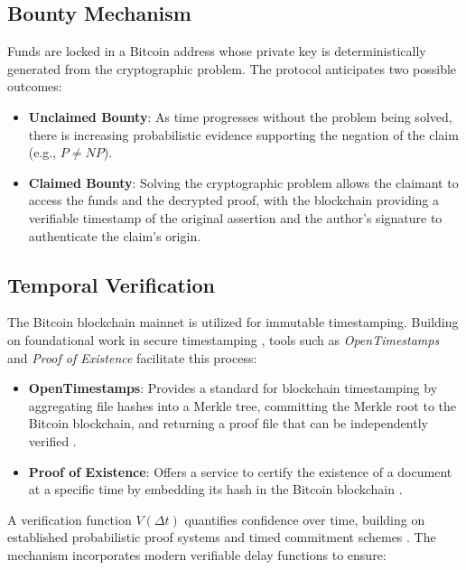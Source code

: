 \documentclass[12pt]{report}
\begin{document}
\subsection{Bounty Mechanism}

Funds are locked in a Bitcoin address whose private key is deterministically generated from the cryptographic problem. The protocol anticipates two possible outcomes:

\begin{itemize}
    \item \textbf{Unclaimed Bounty}: As time progresses without the problem being solved, there is increasing probabilistic evidence supporting the negation of the claim (e.g., \( P \neq NP \)).
    \item \textbf{Claimed Bounty}: Solving the cryptographic problem allows the claimant to access the funds and the decrypted proof, with the blockchain providing a verifiable timestamp of the original assertion and the author's signature to authenticate the claim's origin.
\end{itemize}

\subsection{Temporal Verification}
The Bitcoin blockchain mainnet \cite{Nakamoto2008} is utilized for immutable timestamping. Building on foundational work in secure timestamping \cite{HaberStornetta1991}, tools such as \textit{OpenTimestamps} and \textit{Proof of Existence} facilitate this process:

\begin{itemize}
    \item \textbf{OpenTimestamps}: Provides a standard for blockchain timestamping by aggregating file hashes into a Merkle tree, committing the Merkle root to the Bitcoin blockchain, and returning a proof file that can be independently verified \cite{opentimestamps}.
    \item \textbf{Proof of Existence}: Offers a service to certify the existence of a document at a specific time by embedding its hash in the Bitcoin blockchain \cite{proofofexistence}.
\end{itemize}

A verification function \( V(\Delta t) \) quantifies confidence over time, building on established probabilistic proof systems \cite{BabaiMoran1988} and timed commitment schemes \cite{BonehNaor2000}. The mechanism incorporates modern verifiable delay functions \cite{BonehBunzFisch2018} to ensure:
\end{document}
